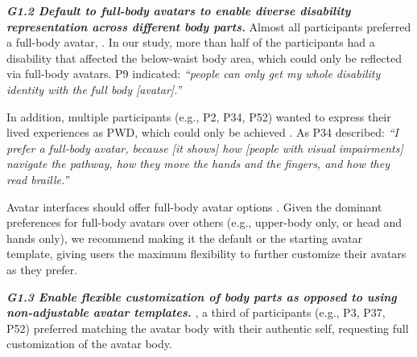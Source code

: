 \textbf{\textit{G1.2 Default to full-body avatars to enable diverse disability representation across different body parts.}}
Almost all participants preferred a full-body avatar, . In our study, more than half of the participants had a disability that affected the below-waist body area, which could only be reflected via full-body avatars. P9 indicated: \textit{``people can only get my whole disability identity with the full body [avatar].''}

In addition, multiple participants (e.g., P2, P34, P52) wanted to express their lived experiences as PWD, which could only be achieved . As P34 described: \textit{``I prefer a full-body avatar, because [it shows] how [people with visual impairments] navigate the pathway, how they move the hands and the fingers, and how they read braille.''} %

 Avatar interfaces should offer full-body avatar options \cite{kelly2023}. Given the dominant preferences for full-body avatars over others (e.g., upper-body only, or head and hands only), we recommend making it the default or the starting avatar template, giving users the maximum flexibility to further customize their avatars as they prefer. 

\textbf{\textit{G1.3 Enable flexible customization of body parts as opposed to using non-adjustable avatar templates.}}
, a third of participants (e.g., P3, P37, P52) preferred matching the avatar body with their authentic self, requesting full customization of the avatar body. 

